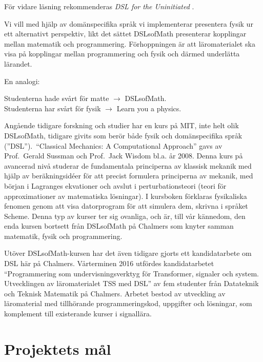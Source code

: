 \begin{draft}
För vidare läsning rekommenderas \textit{DSL for the Uninitiated} \cite{DSLU}. 

Vi vill med hjälp av domänspecifika språk vi implementerar presentera fysik ur ett alternativt perspektiv, likt det sättet DSLsofMath presenterar kopplingar mellan matematik och programmering. Förhoppningen är att läromaterialet ska visa på kopplingar mellan programmering och fysik och därmed underlätta lärandet.

En analogi:

Studenterna hade svårt för matte $\rightarrow $ DSLsofMath.\\
Studenterna har svårt för fysik $\rightarrow $ Learn you a physics.

Angående tidigare forskning och studier har en kurs på MIT, inte helt olik DSLsofMath, tidigare givits som berör både
fysik och domänspecifika språk (''DSL'').\ ``Classical Mechanics: A Computational Approach'' gavs av
Prof.\ Gerald Sussman och Prof.\ Jack Wisdom bl.a. år
2008.\cite{classical-mechanics-course-mit-2008}
Denna kurs på avancerad nivå studerar de fundamentala principerna av klassisk
mekanik med hjälp av beräkningsidéer för att precist formulera principerna av
mekanik, med början i Lagranges ekvationer och avslut i
perturbationsteori (teori för approximationer av matematiska lösningar). I kursboken\cite{SICM}
förklaras fysikaliska fenomen genom att visa datorprogram för att
simulera dem, skrivna i språket Scheme.
Denna typ av kurser ter sig ovanliga, och är, till vår kännedom, den enda kursen bortsett från DSLsofMath på Chalmers som knyter samman matematik, fysik och programmering.

Utöver DSLsofMath-kursen har det även tidigare gjorts ett kandidatarbete om DSL
här på Chalmers. Vårterminen 2016 utfördes kandidatarbetet
``Programmering som undervisningsverktyg för Transformer, signaler och
system. Utvecklingen av läromaterialet TSS med DSL'' av fem studenter
från Datateknik och Teknisk Matematik på Chalmers. Arbetet bestod av
utveckling av läromaterial med tillhörande programmeringskod,
uppgifter och lösningar, som komplement till existerande kurser i
signallära.\cite{kandidat2016}
\end{draft}

\section{Projektets mål}

